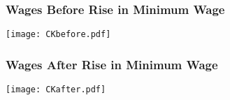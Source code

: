 \documentclass{beamer}
\numberwithin{equation}{section}
\begin{document}
\begin{frame}
  \frametitle{Wages Before Rise in Minimum Wage}
\begin{center}
\texttt{[image: CKbefore.pdf]}
\end{center}
\end{frame}

\begin{frame}
  \frametitle{Wages After Rise in Minimum Wage}
  \begin{center}
\texttt{[image: CKafter.pdf]}
\end{center}

\end{frame}

%

%
\end{document}
